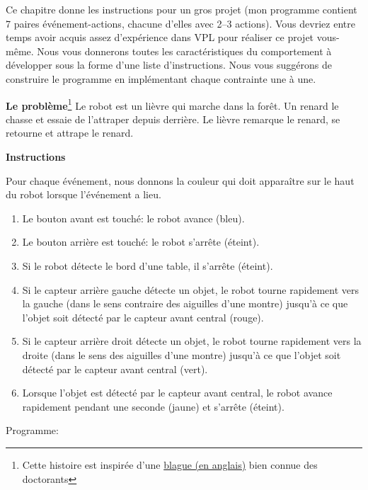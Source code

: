 \label{ch.rabbit}

Ce chapitre donne les instructions pour un gros projet (mon programme
contient 7 paires événement-actions, chacune d'elles avec 2--3
actions).
Vous devriez entre temps avoir acquis assez d'expérience dans VPL
pour réaliser ce projet vous-même. Nous vous donnerons toutes les
caractéristiques du comportement à développer sous la forme d'une
liste d'instructions. Nous vous suggérons de construire le programme en
implémentant chaque contrainte une à une.

\textbf{Le problème}\footnote{Cette histoire est inspirée d'une \href{
http://www.cs.hmc.edu/~fleck/parable.html}{blague (en anglais)} bien connue
des doctorants}
Le robot est un lièvre qui marche dans la forêt.
Un renard le chasse et essaie de l'attraper depuis derrière.
Le lièvre remarque le renard, se retourne et attrape le renard.


\textbf{Instructions}

Pour chaque événement, nous donnons la couleur qui doit apparaître
sur le haut du robot lorsque l'événement a lieu.

\begin{enumerate}
\item Le bouton avant est touché: le robot avance (bleu).
\item Le bouton arrière est touché: le robot s'arrête (éteint).
\item Si le robot détecte le bord d'une table, il s'arrête (éteint).
\item Si le capteur arrière gauche détecte un objet, le robot tourne rapidement
vers la gauche (dans le sens contraire des aiguilles d'une montre) jusqu'à ce que
l'objet soit détecté par le capteur avant central (rouge).
\item Si le capteur arrière droit détecte un objet, le robot tourne rapidement
vers la droite (dans le sens des aiguilles d'une montre)
jusqu'à ce que l'objet soit détecté par le capteur avant central (vert).
\item Lorsque l'objet est détecté par le capteur avant central, le
robot avance rapidement pendant une seconde (jaune) et s'arrête (éteint).
\end{enumerate}

{\raggedleft \hfill Programme: }
